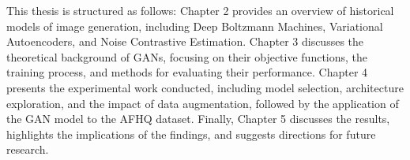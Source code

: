 This thesis is structured as follows: Chapter 2 provides an overview of historical models of image generation, 
including Deep Boltzmann Machines, Variational Autoencoders, and Noise Contrastive Estimation. Chapter 3 discusses 
the theoretical background of GANs, focusing on their objective functions, the training process, and methods 
for evaluating their performance. Chapter 4 presents the experimental work conducted, including model selection, 
architecture exploration, and the impact of data augmentation, followed by the application of the GAN model to the 
AFHQ dataset. Finally, Chapter 5 discusses the results, highlights the implications of the findings, and suggests 
directions for future research.

